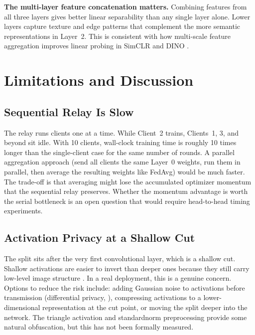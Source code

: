 \documentclass[12pt]{article}
\begin{document}
\textbf{The multi-layer feature concatenation matters.} Combining features from all three layers
gives better linear separability than any single layer alone. Lower layers capture texture and
edge patterns that complement the more semantic representations in Layer~2. This is consistent
with how multi-scale feature aggregation improves linear probing in SimCLR
\citep{chen2020simclr} and DINO \citep{caron2021dino}.

\section{Limitations and Discussion}
\label{sec:limitations}

\subsection{Sequential Relay Is Slow}

The relay runs clients one at a time. While Client~2 trains, Clients~1, 3, and beyond sit idle.
With 10 clients, wall-clock training time is roughly 10 times longer than the single-client case
for the same number of rounds. A parallel aggregation approach (send all clients the same
Layer~0 weights, run them in parallel, then average the resulting weights like FedAvg) would be
much faster. The trade-off is that averaging might lose the accumulated optimizer momentum that
the sequential relay preserves. Whether the momentum advantage is worth the serial bottleneck is
an open question that would require head-to-head timing experiments.

\subsection{Activation Privacy at a Shallow Cut}

The split sits after the very first convolutional layer, which is a shallow cut. Shallow
activations are easier to invert than deeper ones because they still carry low-level image
structure \citep{pasquini2021unleashing}. In a real deployment, this is a genuine concern.
Options to reduce the risk include: adding Gaussian noise to activations before transmission
(differential privacy, \citealt{abadi2016dp}), compressing activations to a lower-dimensional
representation at the cut point, or moving the split deeper into the network. The triangle
activation and standardnorm preprocessing provide some natural obfuscation, but this has not
been formally measured.
\end{document}
